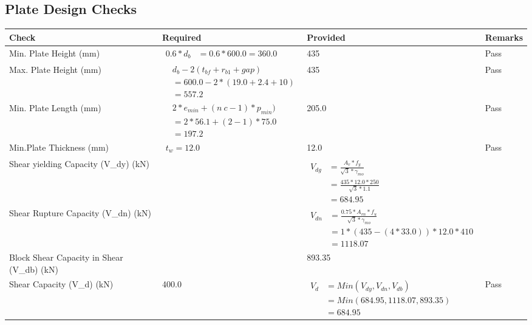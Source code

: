 \documentclass{article}%
\begin{document}
\subsection{Plate Design Checks}%
\label{subsec:PlateDesignChecks}%
\renewcommand{\arraystretch}{1.2}%
\begin{longtable}{|p{4cm}|p{5cm}|p{5.5cm}|p{1.5cm}|}%
\hline%
\rowcolor{OsdagGreen}%
Check&Required&Provided&Remarks\\%
\hline%
\endhead%
\hline%
Min. Plate Height (mm)&$\begin{aligned}0.6 * d_b&= 0.6 * 600.0=360.0\end{aligned}$&435&Pass\\%
\hline%
Max. Plate Height (mm)&$\begin{aligned} &d_b - 2 (t_{bf} + r_{b1} + gap)\\ &=600.0- 2* (19.0+2.4+ 10)\\ &=557.2\end{aligned}$&435&Pass\\%
\hline%
Min. Plate Length (mm)&$\begin{aligned} &2*e_{min} + (n~c-1) * p_{min})\\ &=2*56.1+(2-1) * 75.0\\ &=197.2\end{aligned}$&205.0&Pass\\%
\hline%
Min.Plate Thickness (mm)&$\begin{aligned} t_w=12.0\end{aligned}$&12.0&Pass\\%
\hline%
Shear yielding Capacity (V\_dy) (kN)&&$\begin{aligned} V_{dg} &= \frac{A_v*f_y}{\sqrt{3}*\gamma_{mo}}\\ &=\frac{435*12.0*250}{\sqrt{3}*1.1}\\ &=684.95\end{aligned}$&\\%
\hline%
Shear Rupture Capacity (V\_dn) (kN)&&$\begin{aligned} V_{dn} &= \frac{0.75*A_{vn}*f_u}{\sqrt{3}*\gamma_{mo}}\\ &=1*(435-(4*33.0))*12.0*410\\ &=1118.07\end{aligned}$&\\%
\hline%
Block Shear Capacity in Shear (V\_db) (kN)&&893.35&\\%
\hline%
Shear Capacity (V\_d) (kN)&400.0&$\begin{aligned} V_d &= Min(V_{dy},V_{dn},V_{db})\\ &= Min(684.95,1118.07,893.35)\\ &=684.95\end{aligned}$&Pass\\%

\end{longtable}
\end{document}
